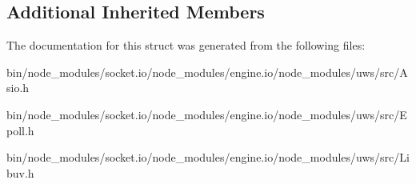 \subsection*{Additional Inherited Members}


The documentation for this struct was generated from the following files\+:\begin{DoxyCompactItemize}
\item 
bin/node\+\_\+modules/socket.\+io/node\+\_\+modules/engine.\+io/node\+\_\+modules/uws/src/Asio.\+h\item 
bin/node\+\_\+modules/socket.\+io/node\+\_\+modules/engine.\+io/node\+\_\+modules/uws/src/Epoll.\+h\item 
bin/node\+\_\+modules/socket.\+io/node\+\_\+modules/engine.\+io/node\+\_\+modules/uws/src/Libuv.\+h\end{DoxyCompactItemize}
